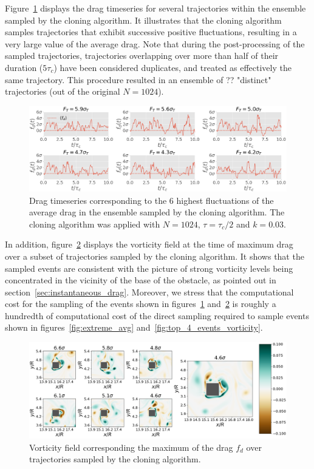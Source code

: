 \documentclass{jfm}
\begin{document}
Figure~\ref{fig:timeseries_extrms_AVG_GKTL} displays the drag timeseries for several trajectories within the ensemble sampled by the cloning algorithm.
It illustrates that the cloning algorithm samples trajectories that exhibit successive positive fluctuations, resulting in a very large value of the average drag.
Note that during the post-processing of the sampled trajectories, trajectories overlapping over more than half of their duration ($5 \tau_c$) have been considered duplicates, and treated as effectively the same trajectory.
This procedure resulted in an ensemble of ?? "distinct" trajectories (out of the original $N = 1024$).

\begin{figure}
  \centering
  \includegraphics[width=\linewidth]{timeseries_extrms_AVG_GKTL/timeseries_extrms_AVG_GKTL}
  \caption{Drag timeseries corresponding to the 6 highest fluctuations of the average drag in the ensemble sampled by the cloning algorithm. The cloning algorithm was applied with $N = 1024$, $\tau = \tau_c / 2$ and $k = 0.03$. }
  \label{fig:timeseries_extrms_AVG_GKTL}
\end{figure}

In addition, figure~\ref{fig:illustr_extrms_vorticity_GKTL} displays the vorticity field at the time of maximum drag over a subset of trajectories
sampled by the cloning algorithm.
It shows that the sampled events are consistent with the picture of strong vorticity levels being concentrated in the vicinity of the base of the obstacle, as pointed out in section~\ref{sec:instantaneous_drag}.
Moreover, we stress that the computational cost for the sampling of the events shown in figures~\ref{fig:timeseries_extrms_AVG_GKTL} and~\ref{fig:illustr_extrms_vorticity_GKTL} is roughly a hundredth of computational cost of the direct sampling required to sample events shown in figures~\ref{fig:extreme_avg} and~\ref{fig:top_4_events_vorticity}.

\begin{figure}
  \centering
  \includegraphics[width=\linewidth]{illustr_extrms_vorticity_GKTL/illustr_extrms_vorticity_GKTL}
  \caption{Vorticity field corresponding the maximum of the drag $f_d$ over trajectories sampled by the cloning algorithm.}
  \label{fig:illustr_extrms_vorticity_GKTL}
\end{figure}
\end{document}
